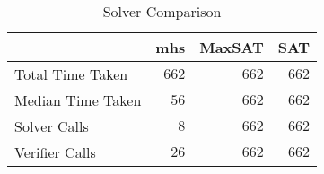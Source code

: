 \begin{table}[htp]
\caption{Solver Comparison}
\label{Ta:solver_comparison}
\begin{center}

\def\arraystretch{1.1}
\setlength\tabcolsep{7pt}

\begin{tabular}{|l|r|r|r|}
\hline

\multicolumn{1}{|c|}{} & \multicolumn{1}{|c|}{\textbf{mhs}} & \multicolumn{1}{|c|}{\textbf{MaxSAT}} & \multicolumn{1}{|c|}{\textbf{SAT}} \\ \hline \hline
Total Time Taken & $662$ & $662$ & $662$\\ \hline
Median Time Taken & $56$ & $662$ & $662$\\ \hline
Solver Calls & $8$ & $662$ & $662$\\ \hline
Verifier Calls & $26$ & $662$ & $662$\\ \hline

\end{tabular}

\end{center}
\end{table}
